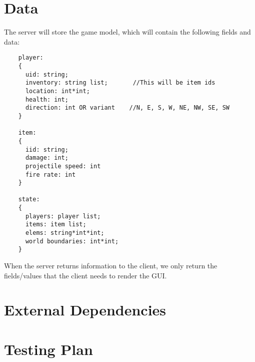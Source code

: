 \documentclass{article}
\begin{document}
    \section{Data}
    The server will store the game model, which will contain the following fields and data:
	\begin{verbatim}
	player:
	{
	  uid: string;
	  inventory: string list;    	//This will be item ids
	  location: int*int;
	  health: int;
	  direction: int OR variant    //N, E, S, W, NE, NW, SE, SW
	}	
	
	item: 
	{
	  iid: string;
	  damage: int;
	  projectile speed: int
	  fire rate: int
	}
	
	state:
	{
	  players: player list;
	  items: item list;
	  elems: string*int*int;
	  world boundaries: int*int;
	}
	\end{verbatim}
    When the server returns information to the client, we only return the fields/values that the client needs to render the GUI.
    
    \section{External Dependencies}

            

    \section{Testing Plan}
\end{document}
